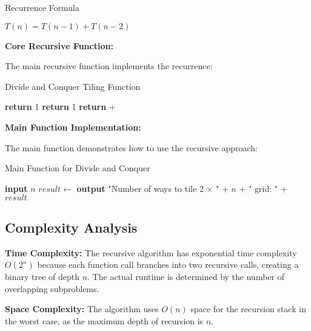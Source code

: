 \documentclass[conference]{IEEEtran}
\begin{document}
\begin{algorithm}[htbp]
\caption{Recurrence Formula}
\begin{algorithmic}[1]
\State $T(n) = T(n-1) + T(n-2)$
\State {}
\end{algorithmic}
\end{algorithm}

\textbf{Core Recursive Function:}

The main recursive function implements the recurrence:

\begin{algorithm}[htbp]
\caption{Divide and Conquer Tiling Function}
\begin{algorithmic}[1]
        \State \textbf{return} 1
    \EndIf
        \State \textbf{return} 1
    \EndIf
    \State \textbf{return}  + 
\EndProcedure
\end{algorithmic}
\end{algorithm}

\textbf{Main Function Implementation:}

The main function demonstrates how to use the recursive approach:

\begin{algorithm}[htbp]
\caption{Main Function for Divide and Conquer}
\begin{algorithmic}[1]
    \State \textbf{input} $n$ 
    \State $result \gets$ 
    \State \textbf{output} "Number of ways to tile 2 × " + $n$ + " grid: " + $result$
\EndProcedure
\end{algorithmic}
\end{algorithm}

\subsection{Complexity Analysis}

\textbf{Time Complexity:} The recursive algorithm has exponential time complexity $O(2^n)$ because each function call branches into two recursive calls, creating a binary tree of depth $n$. The actual runtime is determined by the number of overlapping subproblems.

\textbf{Space Complexity:} The algorithm uses $O(n)$ space for the recursion stack in the worst case, as the maximum depth of recursion is $n$.
\end{document}

